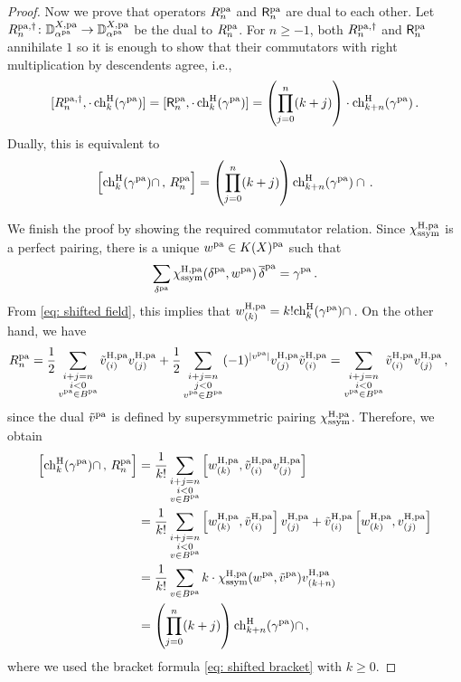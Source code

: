 \documentclass[a4paper, 12pt]{amsart}
\begin{document}
\begin{proof}
Now we prove that operators $R_n^{\pa}$ and $\bR_n^{\pa}$ are dual to each other. Let $R_n^{{\pa}, \dagger}\colon \BD^{X,\pa}_{\alpha^{\pa}}\to \BD^{X,\pa}_{\alpha^{\pa}}$ be the dual to $R_n^{\pa}$. For $n\geq -1$, both $R_n^{{\pa}, \dagger}$ and $\bR_n^{\pa}$ annihilate $1$ so it is enough to show that their commutators with right multiplication by descendents agree, i.e.,
\[[R_n^{\pa, \dagger}, \cdot\,\chh_k(\gamma^{\pa})]=[\bR_n^{\pa}, \cdot\,\chh_k(\gamma^{\pa})]=\left(\prod_{j=0}^n(k+j)\right)\cdot\ch_{k+n}^\HH(\gamma^{\pa})\,.\]
Dually, this is equivalent to
\begin{equation*}
\left[\ch_k^{\HH}(\gamma^{\pa})\cap\,,\,R_n^{\pa}\right]=\left(\prod_{j=0}^n(k+j)\right)\ch_{k+n}^\HH(\gamma^{\pa})\cap\,.
\end{equation*}

We finish the proof by showing the required commutator relation. Since $\chi^{\HH,\pa}_{\ssym}$ is a perfect pairing, there is a unique $w^{\pa}\in K(X)^{\pa}$ such that 
$$\sum_{\delta^{\pa}}\chi^{\HH,\pa}_{\ssym}(\delta^{\pa}, w^{\pa})\,\overline{\delta}^{\pa}=\gamma^{\pa}\,.
$$
From \eqref{eq: shifted field}, this implies that $w_{(k)}^{\HH,\pa}=k!\ch_k^\HH(\gamma^{\pa})\cap\,$. On the other hand, we have
\begin{align*}
    R_n^{\pa}
    &=\frac{1}{2}\sum_{\substack{ i+j=n\\ i<0\\ v^{\pa}\in B^{\pa}}}\tilde{v}^{\HH,\pa}_{(i)} v^{\HH,\pa}_{(j)}
    +\frac{1}{2}\sum_{\substack{ i+j=n\\ j<0 \\ v^{\pa}\in B^{\pa}}}(-1)^{|v^{\pa}|} v^{\HH,\pa}_{(j)}\tilde{v}^{\HH,\pa}_{(i)}
    =\sum_{\substack{ i+j=n\\ i<0\\ v^{\pa}\in B^{\pa}}}\tilde{v}^{\HH,\pa}_{(i)} v^{\HH,\pa}_{(j)}\,,
\end{align*}
since the dual $\tilde{v}^{\pa}$ is defined by supersymmetric pairing $\chi^{\HH,\pa}_{\ssym}$. Therefore, we obtain 
\begin{align*}
    \left[\ch_k^{\HH}(\gamma^{\pa})\cap\,,\,R_n^{\pa}\right]
    &=\frac{1}{k!}\sum_{\substack{ i+j=n\\ i<0\\ v\in B^{\pa}}}
    \left[w_{(k)}^{\HH,\pa}, \tilde{v}^{\HH,\pa}_{(i)}v^{\HH,\pa}_{(j)}\right]\\
    &=\frac{1}{k!}\sum_{\substack{ i+j=n\\ i<0\\ v\in B^{\pa}}} \left[w^{\HH,\pa}_{(k)}, \tilde{v}^{\HH,\pa}_{(i)}\right]v^{\HH,\pa}_{(j)}+\tilde{v}^{\HH,\pa}_{(i)}\left[w^{\HH,\pa}_{(k)},v^{\HH,\pa}_{(j)}\right]\\
    &=\frac{1}{k!}\sum_{v\in B^{\pa}}k\cdot\chi^{\HH,\pa}_{\ssym}(w^{\pa},\tilde{v}^{\pa})v_{(k+n)}^{\HH,\pa}\\
    &=\left(\prod_{j=0}^n(k+j)\right)\chh_{k+n}(\gamma^{\pa})\cap\,,
\end{align*}
where we used the bracket formula \eqref{eq: shifted bracket} with $k\geq 0$.  
\end{proof}
\end{document}
